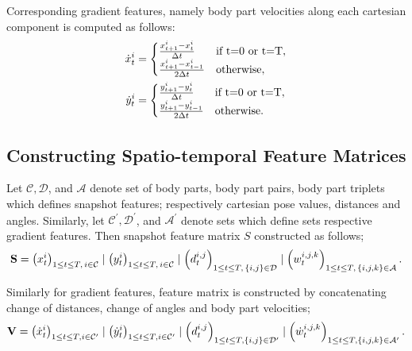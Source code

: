 Corresponding gradient features, namely body part velocities along each cartesian component is computed as follows:
\begin{align}
	\dot{x}^{i}_t & = \begin{cases} \frac{x^{i}_{t+1} - x^{i}_{t}}{\Delta t} & \textnormal{if } $t=0$ \textnormal{ or } $t=T$, \\ \frac{x^{i}_{t+1} - x^{i}_{t-1}}{2\Delta t} & \textnormal{otherwise}, \end{cases} \\
	\dot{y}^{i}_t & = \begin{cases} \frac{y^{i}_{t+1} - y^{i}_{t}}{\Delta t} & \textnormal{if } $t=0$ \textnormal{ or } $t=T$, \\ \frac{y^{i}_{t+1} - y^{i}_{t-1}}{2\Delta t} & \textnormal{otherwise}. \end{cases}
\end{align}

\subsection{Constructing Spatio-temporal Feature Matrices}
Let $\mathcal{C}, \mathcal{D}$, and $\mathcal{A}$ denote set of body parts, body part pairs, body part triplets which defines snapshot features; respectively cartesian pose values, distances and angles.
Similarly, let $\mathcal{C}^{\prime}, \mathcal{D}^{\prime}$, and $\mathcal{A}^{\prime}$ denote sets which define sets respective gradient features.
Then snapshot feature matrix $S$ constructed as follows;
\begin{equation}
	\mathbf{S} = \left(x^i_t\right)_{1 \leq t \leq T, \, i \in \mathcal{C}} \mid \left(y^i_t\right)_{1 \leq t \leq T, \, i \in \mathcal{C}} \mid \left(d^{i,j}_t\right)_{1 \leq t \leq T, \, \left\{i,j\right\} \in \mathcal{D}} \mid \left(w_t^{i,j,k}\right)_{1 \leq t \leq T, \, \left\{i,j,k\right\} \in \mathcal{A}} .
\end{equation}

Similarly for gradient features, feature matrix is constructed by concatenating change of distances, change of angles and body part velocities;
\begin{equation}
	\mathbf{V} = \left(\dot{x}^i_t\right)_{1 \leq t \leq T, i \in \mathcal{C}^{\prime}} \mid \left(\dot{y}^i_t\right)_{1 \leq t \leq T, i \in \mathcal{C}^{\prime}} \mid \left(d^{i,j}_t\right)_{1 \leq t \leq T, \left\{i,j\right\} \in \mathcal{D}^{\prime}} \mid \left(\dot{w}_t^{i,j,k}\right)_{1 \leq t \leq T, \left\{i,j,k\right\} \in \mathcal{A}^{\prime}} .
\end{equation}

